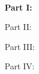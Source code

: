 


\ifseries
\thispagestyle{empty}


\parbox{0.9\textwidth}{
  \begin{center}
	\bfseries \sffamily \LARGE \titleOfTheBookSeries\\
    \textit{\nameOfTheBookSeries}
  \end{center}
}

\begin{center}



\sffamily \textbf{Part I: \partOneTitle}

\sffamily Part II: \partTwoTitle

\sffamily Part III: \partThreeTitle

\sffamily Part IV: \partFourTitle

\end{center}

\fi